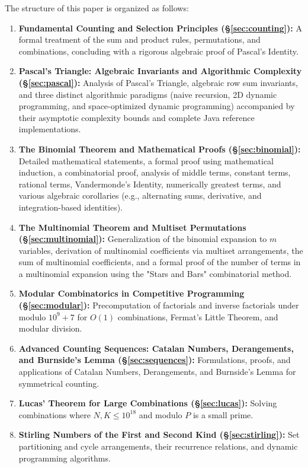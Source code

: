 \documentclass[10pt,journal,compsoc,onecolumn]{IEEEtran}
\begin{document}
The structure of this paper is organized as follows:
\begin{enumerate}
    \item \textbf{Fundamental Counting and Selection Principles (\S\ref{sec:counting}):} A formal treatment of the sum and product rules, permutations, and combinations, concluding with a rigorous algebraic proof of Pascal's Identity.
    \item \textbf{Pascal's Triangle: Algebraic Invariants and Algorithmic Complexity (\S\ref{sec:pascal}):} Analysis of Pascal's Triangle, algebraic row sum invariants, and three distinct algorithmic paradigms (naive recursion, 2D dynamic programming, and space-optimized dynamic programming) accompanied by their asymptotic complexity bounds and complete Java reference implementations.
    \item \textbf{The Binomial Theorem and Mathematical Proofs (\S\ref{sec:binomial}):} Detailed mathematical statements, a formal proof using mathematical induction, a combinatorial proof, analysis of middle terms, constant terms, rational terms, Vandermonde's Identity, numerically greatest terms, and various algebraic corollaries (e.g., alternating sums, derivative, and integration-based identities).
    \item \textbf{The Multinomial Theorem and Multiset Permutations (\S\ref{sec:multinomial}):} Generalization of the binomial expansion to $m$ variables, derivation of multinomial coefficients via multiset arrangements, the sum of multinomial coefficients, and a formal proof of the number of terms in a multinomial expansion using the "Stars and Bars" combinatorial method.
    \item \textbf{Modular Combinatorics in Competitive Programming (\S\ref{sec:modular}):} Precomputation of factorials and inverse factorials under modulo $10^9+7$ for $O(1)$ combinations, Fermat's Little Theorem, and modular division.
    \item \textbf{Advanced Counting Sequences: Catalan Numbers, Derangements, and Burnside's Lemma (\S\ref{sec:sequences}):} Formulations, proofs, and applications of Catalan Numbers, Derangements, and Burnside's Lemma for symmetrical counting.
    \item \textbf{Lucas' Theorem for Large Combinations (\S\ref{sec:lucas}):} Solving combinations where $N, K \le 10^{18}$ and modulo $P$ is a small prime.
    \item \textbf{Stirling Numbers of the First and Second Kind (\S\ref{sec:stirling}):} Set partitioning and cycle arrangements, their recurrence relations, and dynamic programming algorithms.

\end{enumerate}
\end{document}
